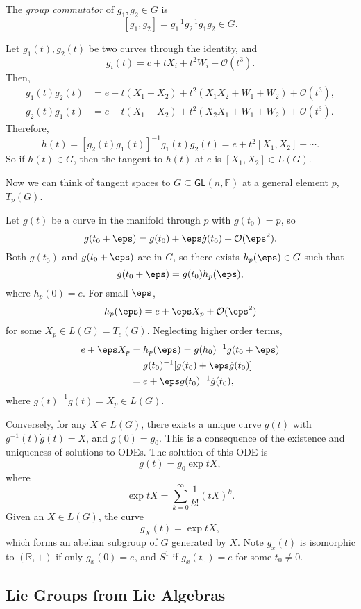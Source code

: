 \documentclass[12pt]{article}
\begin{document}
\begin{definition}
	The \emph{group commutator} of $g_1, g_2 \in G$ is
	\[
		[g_1, g_2] = g_1^{-1} g_2^{-1} g_1 g_2 \in G.
	\]
\end{definition}

Let $g_1(t), g_2(t)$ be two curves through the identity, and
\[
g_i(t) = c + t X_i + t^2 W_i + \mathcal{O}(t^3).
\]
Then,
\begin{align*}
	g_1(t) g_2(t) &= e + t(X_1 + X_2) + t^2(X_1 X_2 + W_1 + W_2) + \mathcal{O}(t^3), \\
	g_2(t) g_1(t) &= e + t(X_1 + X_2) + t^2(X_2 X_1 + W_1 + W_2) + \mathcal{O}(t^3).
\end{align*}
Therefore,
\[
	h(t) = [g_2(t)g_1(t)]^{-1} g_1(t) g_2(t) = e + t^2[X_1, X_2] + \cdots.
\]
So if $h(t) \in G$, then the tangent to $h(t)$ at $e$ is $[X_1, X_2] \in L(G)$.

Now we can think of tangent spaces to $G \subseteq \mathsf{GL}(n, \mathbb{F})$ at a general element $p$, $T_p(G)$.

Let $g(t)$ be a curve in the manifold through $p$ with $g(t_0) = p$, so
\[
g(t_0 + \eps) = g(t_0) + \eps \dot g (t_0) + \mathcal{O}(\eps^2).
\]
Both $g(t_0)$ and $g(t_0 + \eps)$ are in $G$, so there exists $h_p(\eps) \in G$ such that
\[
g(t_0 + \eps) = g(t_0) h_p(\eps),
\]
where $h_p(0) = e$. For small $\eps$,
\[
h_p(\eps) = e + \eps X_p + \mathcal{O}(\eps^2)
\]
for some $X_p \in L(G) = T_e(G)$. Neglecting higher order terms,
\begin{align*}
	e + \eps X_p &= h_p(\eps) = g(h_0)^{-1} g(t_0 + \eps) \\
		     &= g(t_0)^{-1} [g(t_0) + \eps \dot g (t_0)] \\
		     &= e + \eps g(t_0)^{-1} \dot g(t_0),
\end{align*}
where $g(t)^{-1} \dot g(t) = X_p \in L(G)$.

Conversely, for any $X \in L(G)$, there exists a unique curve $g(t)$ with $g^{-1}(t) \dot g(t) = X$, and $g(0) = g_0$. This is a consequence of the existence and uniqueness of solutions to ODEs. The solution of this ODE is
\[
g(t) = g_0 \exp tX,
\]
where
\[
\exp tX = \sum_{k = 0}^\infty \frac{1}{k!} (tX)^k.
\]
Given an $X \in L(G)$, the curve
\[
g_X(t) = \exp tX,
\]
which forms an abelian subgroup of $G$ generated by $X$. Note $g_x(t)$ is isomorphic to $(\mathbb{R}, +)$ if only $g_x(0)=  e$, and $S^1$ if $g_x(t_0) = e$ for some $t_0 \neq 0$.


\subsection{Lie Groups from Lie Algebras}%
\label{sub:lg_la}
\end{document}
